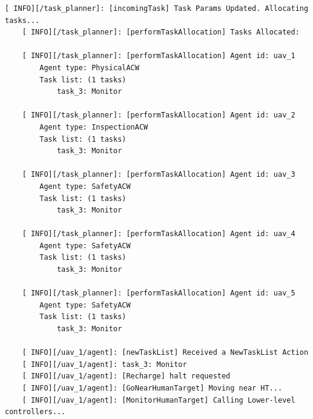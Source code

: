 \begin{lstlisting}[caption={Feedback messages printed after changing the parameters of a task}, breaklines=true, label=exit:paramChange]
    [ INFO][/task_planner]: [incomingTask] Task Params Updated. Allocating tasks...
    [ INFO][/task_planner]: [performTaskAllocation] Tasks Allocated:
    
    [ INFO][/task_planner]: [performTaskAllocation] Agent id: uav_1
        Agent type: PhysicalACW
        Task list: (1 tasks)
            task_3: Monitor
    
    [ INFO][/task_planner]: [performTaskAllocation] Agent id: uav_2
        Agent type: InspectionACW
        Task list: (1 tasks)
            task_3: Monitor
    
    [ INFO][/task_planner]: [performTaskAllocation] Agent id: uav_3
        Agent type: SafetyACW
        Task list: (1 tasks)
            task_3: Monitor
    
    [ INFO][/task_planner]: [performTaskAllocation] Agent id: uav_4
        Agent type: SafetyACW
        Task list: (1 tasks)
            task_3: Monitor
    
    [ INFO][/task_planner]: [performTaskAllocation] Agent id: uav_5
        Agent type: SafetyACW
        Task list: (1 tasks)
            task_3: Monitor
    
    [ INFO][/uav_1/agent]: [newTaskList] Received a NewTaskList Action
    [ INFO][/uav_1/agent]: task_3: Monitor
    [ INFO][/uav_1/agent]: [Recharge] halt requested
    [ INFO][/uav_1/agent]: [GoNearHumanTarget] Moving near HT...
    [ INFO][/uav_1/agent]: [MonitorHumanTarget] Calling Lower-level controllers...
\end{lstlisting}


